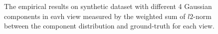 \documentclass[11pt]{article}
\begin{document}
\begin{figure}
\caption{The empirical results on synthetic dataset with different 4 Gaussian components in eavh view measured by the weighted sum of $l2$-norm between the component distribution and ground-truth for each view.}
\end{figure}
\end{document}
